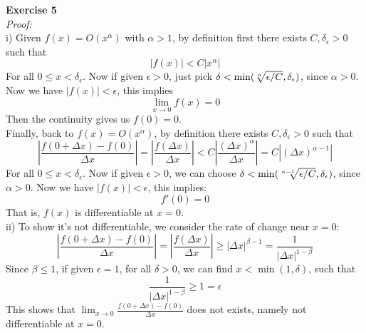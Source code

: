 \documentclass[12pt]{article}
\begin{document}
{\bf Exercise 5}\\
{\it Proof:}\\
i) Given $f(x)=O(x^{\alpha})$ with $\alpha>1$, by definition first there exists $C,\delta_{\epsilon}>0$ such that
\[
|f(x)|<C|x^{\alpha}|
\]
For all $0\leq x<\delta_{\epsilon}$. Now if given $\epsilon>0$, just pick $\delta<\min(\root \alpha \of {\epsilon/C},\delta_{\epsilon})$, since $\alpha>0$. Now we have $|f(x)|<\epsilon$, this implies
\[
\lim_{x\to0}f(x)=0
\]
Then the continuity gives us $f(0)=0$.\\
Finally, back to $f(x)=O(x^{\alpha})$,  by definition there exists $C,\delta_{\epsilon}>0$ such that
\[
\left|\frac{f(0+\Delta x)-f(0)}{\Delta x}\right|=\left|\frac{f(\Delta x)}{\Delta x}\right|<C\left|\frac{{(\Delta x)}^{\alpha}}{\Delta x}\right|=C|{(\Delta x)}^{\alpha-1}|
\]
For all $0\leq x<\delta_{\epsilon}$. Now if given $\epsilon>0$, we can choose $\delta<\min(\root \alpha-1 \of {\epsilon/C},\delta_{\epsilon})$, since $\alpha>0$. Now we have $|f(x)|<\epsilon$, this implies:
\[
f'(0)=0
\]
That is, $f(x)$ is differentiable at $x=0$.\\
ii) To show it's not differentiable, we consider the rate of change near $x=0$:
\[
\left|\frac{f(0+\Delta x)-f(0)}{\Delta x}\right|=\left|\frac{f(\Delta x)}{\Delta x}\right|\ge{|\Delta x|}^{\beta-1}=\frac{1}{|\Delta x|^{1-\beta}}
\]
Since $\beta\le1$, if given $\epsilon=1$, for all $\delta>0$, we can find $x<\min(1,\delta)$, such that
\[
\frac{1}{|\Delta x|^{1-\beta}}\ge1=\epsilon
\]
This shows that $\displaystyle\lim_{x\to0}\frac{f(0+\Delta x)-f(0)}{\Delta x}$ does not exists, namely not differentiable at $x=0$.
\end{document}
